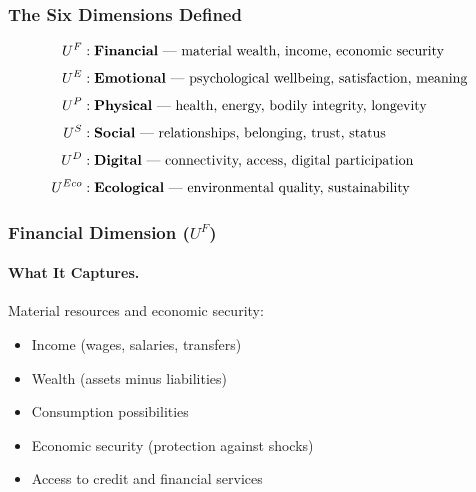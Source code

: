 \subsubsection{The Six Dimensions Defined}

\begin{definition}
\label{def:fepsde-dimensions}
\begin{align*}
U^F &: \text{\textbf{Financial} --- material wealth, income, economic security} \\[0.3em]
U^E &: \text{\textbf{Emotional} --- psychological wellbeing, satisfaction, meaning} \\[0.3em]
U^P &: \text{\textbf{Physical} --- health, energy, bodily integrity, longevity} \\[0.3em]
U^S &: \text{\textbf{Social} --- relationships, belonging, trust, status} \\[0.3em]
U^D &: \text{\textbf{Digital} --- connectivity, access, digital participation} \\[0.3em]
U^{Eco} &: \text{\textbf{Ecological} --- environmental quality, sustainability}
\end{align*}
\end{definition}

\subsubsection{Financial Dimension ($U^F$)}

\paragraph{What It Captures.}
Material resources and economic security:
\begin{itemize}
\item Income (wages, salaries, transfers)
\item Wealth (assets minus liabilities)
\item Consumption possibilities
\item Economic security (protection against shocks)
\item Access to credit and financial services
\end{itemize}

